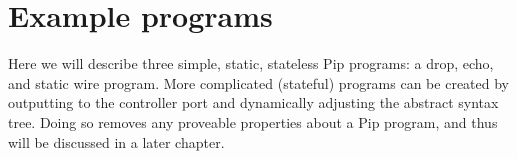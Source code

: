 
\section{Example programs}

Here we will describe three simple, static, stateless Pip programs: a drop, echo, and static wire program. More complicated (stateful) programs can be created by outputting to the controller port and dynamically adjusting the abstract syntax tree. Doing so removes any proveable properties about a Pip program, and thus will be discussed in a later chapter.



